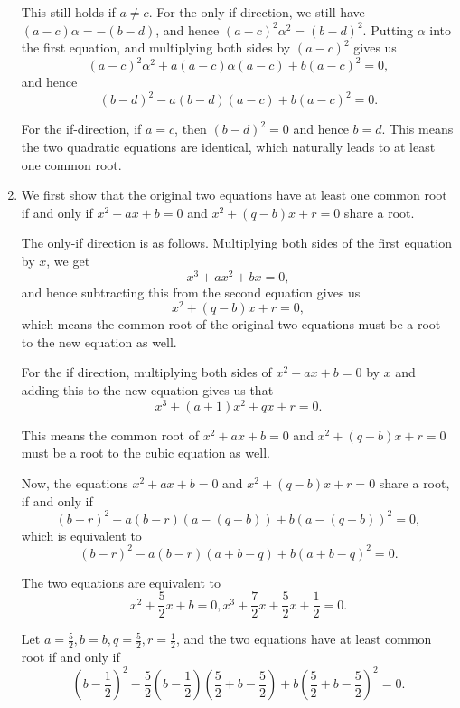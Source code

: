 \begin{enumerate}
          This still holds if \(a \neq c\). For the only-if direction, we still have \((a - c) \alpha = -(b - d)\), and hence \((a - c)^2 \alpha^2 = (b - d)^2\). Putting \(\alpha\) into the first equation, and multiplying both sides by \((a - c)^2\) gives us
          \[
              (a - c)^2 \alpha^2 + a (a - c) \alpha (a - c) + b (a - c)^2 = 0,
          \]
          and hence
          \[
              (b - d)^2 - a (b - d) (a - c) + b (a - c)^2 = 0.
          \]

          For the if-direction, if \(a = c\), then \((b - d)^2 = 0\) and hence \(b = d\). This means the two quadratic equations are identical, which naturally leads to at least one common root.

    \item We first show that the original two equations have at least one common root if and only if \(x^2 + ax + b = 0\) and \(x^2 + (q - b)x + r = 0\) share a root.

          The only-if direction is as follows. Multiplying both sides of the first equation by \(x\), we get
          \[
              x^3 + ax^2 + bx = 0,
          \]
          and hence subtracting this from the second equation gives us
          \[
              x^2 + (q - b)x + r = 0,
          \]
          which means the common root of the original two equations must be a root to the new equation as well.

          For the if direction, multiplying both sides of \(x^2 + ax + b = 0\) by \(x\) and adding this to the new equation gives us that
          \[
              x^3 + (a + 1) x^2 + qx + r = 0.
          \]

          This means the common root of \(x^2 + ax + b = 0\) and \(x^2 + (q - b)x + r = 0\) must be a root to the cubic equation as well.

          Now, the equations \(x^2 + ax + b = 0\) and \(x^2 + (q - b)x + r = 0\) share a root, if and only if
          \[
              (b - r)^2 - a (b - r) (a - (q - b)) + b (a - (q - b))^2 = 0,
          \]
          which is equivalent to
          \[
              (b - r)^2 - a (b - r) (a + b - q) + b (a + b - q)^2 = 0.
          \]

          The two equations are equivalent to
          \[
              x^2 + \frac{5}{2}x + b = 0, x^3 + \frac{7}{2}x + \frac{5}{2}x + \frac{1}{2} = 0.
          \]

          Let \(a = \frac{5}{2}, b = b, q = \frac{5}{2}, r = \frac{1}{2}\), and the two equations have at least common root if and only if
          \[
              \left(b - \frac{1}{2}\right)^2 - \frac{5}{2} \left(b - \frac{1}{2}\right) \left(\frac{5}{2} + b - \frac{5}{2}\right) + b \left(\frac{5}{2} + b - \frac{5}{2}\right)^2 = 0.
          \]


\end{enumerate}
